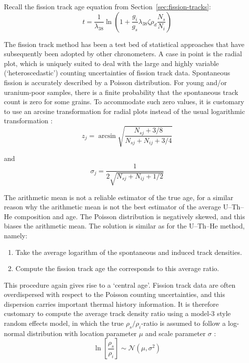 \begin{refsection}
Recall the fission track age equation from
Section~\ref{sec:fission-tracks}:
\begin{equation}
t =
\frac{1}{\lambda_{38}}\ln\left(1+\frac{g_i}{g_s}
\lambda_{38}\zeta\rho_d\frac{N_s}{N_i}\right)
\label{eq:tzeta2}
\end{equation}

The fission track method has been a test bed of statistical approaches
that have subsequently been adopted by other chronometers. A case in
point is the radial plot, which is uniquely suited to deal with the
large and highly variable (`heteroscedastic') counting uncertainties
of fission track data. Spontaneous fission is accurately described by
a Poisson distribution. For young and/or uranium-poor samples, there
is a finite probability that the spontaneous track count is zero for
some grains.  To accommodate such zero values, it is customary to use
an arcsine transformation for radial plots instead of the usual
logarithmic transformation \citep{galbraith1990a}:
\begin{equation}
z_j = \arcsin\sqrt{\frac{N_{sj} + 3/8}{N_{sj}+N_{ij}+3/4}}
\label{eq:zj}
\end{equation}

\noindent and
\begin{equation}
\sigma_j = \frac{1}{2\sqrt{N_{sj}+N_{ij}+1/2}}
\label{eq:sj}
\end{equation}

The arithmetic mean is not a reliable estimator of the true age, for a
similar reason why the arithmetic mean is not the best estimator of
the average U--Th--He composition and age. The Poisson distribution is
negatively skewed, and this biases the arithmetic mean. The solution
is similar as for the U--Th--He method, namely:

\begin{enumerate}
\item Take the average logarithm of the spontaneous and induced
  track densities.
\item Compute the fission track age the corresponds to this average
  ratio.
\end{enumerate}

This procedure again gives rise to a `central age'. Fission track data
are often overdispersed with respect to the Poisson counting
uncertainties, and this dispersion carries important thermal history
information. It is therefore customary to compute the average track
density ratio using a model-3 style random effects model, in which the
true $\rho_s/\rho_i$-ratio is assumed to follow a log-normal
distribution with location parameter $\mu$ and scale parameter
$\sigma$ \citep{galbraith1993}:
\begin{equation}
\ln\left[\frac{\rho_s}{\rho_i}\right] \sim \mathcal{N}(\mu,\sigma^2)
\label{eq:logrhosrhoi}
\end{equation}


\end{refsection}
